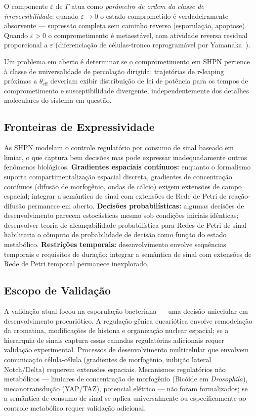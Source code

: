 O componente $\varepsilon$ de $\Gamma$ atua como \emph{parâmetro de ordem da
classe de irreversibilidade}: quando $\varepsilon \to 0$ o estado comprometido
é verdadeiramente absorvente --- supressão completa sem caminho reverso
(esporulação, apoptose).  Quando $\varepsilon > 0$ o comprometimento é
metaestável, com atividade reversa residual proporcional a $\varepsilon$
(diferenciação de células-tronco reprogramável por Yamanaka~\parencite{Takahashi2006}).

Um problema em aberto é determinar se o comprometimento em SHPN pertence à
classe de universalidade de percolação dirigida: trajetórias de $\tau$-leaping
próximas a $\theta_\text{eff}$ deveriam exibir distribuição de lei de potência
para os tempos de comprometimento e susceptibilidade divergente,
independentemente dos detalhes moleculares do sistema em questão.

\subsection{Fronteiras de Expressividade}

As SHPN modelam o controle regulatório por consumo de sinal baseado em limiar,
o que captura bem decisões mas pode expressar
inadequadamente outros fenômenos biológicos.
\textbf{Gradientes espaciais contínuos:} enquanto o formalismo suporta
compartimentalização espacial discreta, gradientes de concentração contínuos
(difusão de morfogênio, ondas de cálcio) exigem extensões de campo espacial;
integrar a semântica de sinal com extensões de Rede de Petri de reação-difusão
permanece em aberto.
\textbf{Decisões probabilísticas:} algumas decisões de desenvolvimento parecem
estocásticas mesmo sob condições iniciais idênticas; desenvolver teoria de
alcançabilidade probabilística para Redes de Petri de sinal habilitaria o
cômputo de probabilidade de decisão como função do estado metabólico.
\textbf{Restrições temporais:} desenvolvimento envolve sequências temporais e
requisitos de duração; integrar a semântica de sinal com extensões de Rede de
Petri temporal permanece inexplorado.

\subsection{Escopo de Validação}

A validação atual focou na esporulação bacteriana — uma decisão unicelular em
desenvolvimento procariótico.
A regulação gênica eucariótica envolve remodelação da cromatina, modificações
de histona e organização nuclear espacial; se a hierarquia de sinais captura
essas camadas regulatórias adicionais requer validação experimental.
Processos de desenvolvimento multicelular que envolvem comunicação célula-célula
(gradientes de morfogênio, inibição lateral Notch/Delta) requerem extensões
espaciais.
Mecanismos regulatórios não metabólicos — limiares de concentração de morfogênio
(Bicóide em \textit{Drosophila}), mecanotransdução (YAP/TAZ), potencial elétrico
— não foram formalizados; se a semântica de consumo de sinal se aplica
universalmente ou especificamente ao controle metabólico requer validação
adicional.

